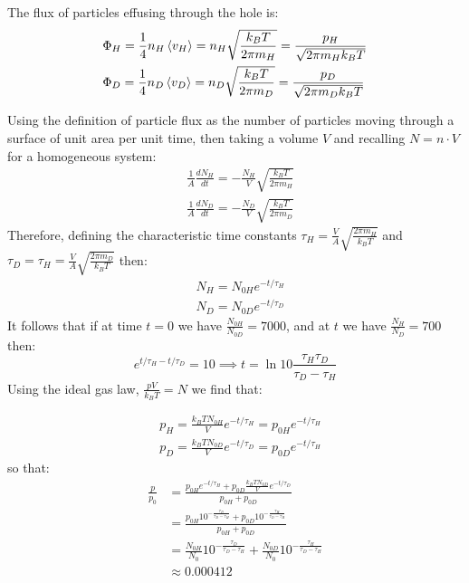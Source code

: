 \documentclass[a4paper,11pt,oneside]{book}
\begin{document}
\begin{mdframed}
\begin{solution}
The flux of particles effusing through the hole is:
\begin{align}
    &\Phi_{H} = \frac{1}{4} n_H \braket{v_H} = n_H \sqrt{\frac{k_BT}{2\pi m_H}} = \frac{p_H}{\sqrt{2\pi m_H k_B T}}\\
    &\Phi_{D} = \frac{1}{4} n_{D} \braket{v_{D}} = n_{D} \sqrt{\frac{k_BT}{2\pi m_{D}}} = \frac{p_{D}}{\sqrt{2\pi m_{D} k_B T}}
\end{align}

Using the definition of particle flux as the number of particles moving through a surface of unit area per unit time, then taking a volume $V$ and recalling $N=n \cdot V$ for a homogeneous system:
\begin{align}
    &\frac{1}{A} \frac{dN_{H}}{dt} =- \frac{N_H}{V} \sqrt{\frac{k_BT}{2\pi m_H}}\\
    &\frac{1}{A} \frac{dN_{D}}{dt} = -\frac{N_{D}}{V} \sqrt{\frac{k_BT}{2\pi m_{D}}}
\end{align}
Therefore, defining the characteristic time constants $\tau_H = \frac{V}{A}\sqrt{\frac{2\pi m_H}{k_B T}}$ and $\tau_{D} = \tau_H = \frac{V}{A}\sqrt{\frac{2\pi m_D}{ k_B T}}$ then:
\begin{align}
    &N_H = N_{0H} e^{-t/\tau_{H}}\\
    &N_D = N_{0D} e^{-t/\tau_{D}}
\end{align}
It follows that if at time $t=0$ we have $\frac{N_{0H}}{N_{0D}}=7000$, and at $t$ we have $\frac{N_{H}}{N_D}=700$ then:
\begin{equation}
    e^{t/\tau_{H}-t/\tau_{D}} = 10 \implies t = \ln 10 \frac{\tau_H \tau_D}{\tau_D - \tau_H} 
\end{equation}
Using the ideal gas law, $\frac{pV}{k_BT}=N$ we find that:

    \begin{align}
    &p_H = \frac{k_BTN_{0H}}{V} e^{-t/\tau_{H}}=p_{0H}e^{-t/\tau_{H}}\\
    &p_D = \frac{k_BTN_{0D}}{V} e^{-t/\tau_{D}} = p_{0D}e^{-t/\tau_{H}}
\end{align}
so that:
\begin{align}
    \frac{p}{p_0} &=  \frac{p_{0H} e^{-t/\tau_{H}} + p_{0D}\frac{k_BTN_{0D}}{V} e^{-t/\tau_{D}}}{p_{0H}+p_{0D}}\\
    &= \frac{p_{0H}10^{-\frac{\tau_D}{\tau_D-\tau_H}}+p_{0D}10^{-\frac{\tau_H}{\tau_D-\tau_H}}}{p_{0H}+ p_{0D}}\\
    &= \frac{N_{0H}}{N_0}10^{-\frac{\tau_D}{\tau_D-\tau_H}} + \frac{N_{0D}}{N_0}10^{-\frac{\tau_H}{\tau_D-\tau_H}}\\
    &\approx 0.000412
\end{align}
\end{solution}
\end{mdframed}
\end{document}

